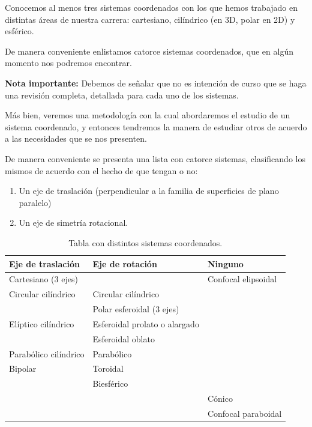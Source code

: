 Conocemos al menos tres sistemas coordenados con los que hemos trabajado en distintas áreas de nuestra carrera: cartesiano, cilíndrico (en 3D, polar en 2D) y esférico.
\par
De manera conveniente enlistamos catorce sistemas coordenados, que en algún momento nos podremos encontrar.
\par
\textbf{Nota importante: } Debemos de señalar que no es intención de curso que se haga una revisión completa, detallada para cada uno de los sistemas.
\par
Más bien, veremos una metodología con la cual abordaremos el estudio de un sistema coordenado, y entonces tendremos la manera de estudiar otros de acuerdo a las necesidades que se nos presenten.
\par
De manera conveniente se presenta una lista con catorce sistemas, clasificando los mismos de acuerdo con el hecho de que tengan o no:
\begin{enumerate}
\item Un eje de traslación (perpendicular a la familia de superficies de plano paralelo)
\item Un eje de simetría rotacional.
\end{enumerate}

\renewcommand{\arraystretch}{1.2}
\begin{table}[H]
\centering
\begin{tabular}{p{4cm} p{6cm} p{4cm}}
Eje de traslación & Eje de rotación & Ninguno \\ \hline
Cartesiano ($3$ ejes) & & Confocal elipsoidal \\
Circular cilíndrico & Circular cilíndrico & \\
& Polar esferoidal ($3$ ejes) & \\
Elíptico cilíndrico & Esferoidal prolato o alargado & \\
& Esferoidal oblato & \\
Parabólico cilíndrico & Parabólico & \\
Bipolar & Toroidal & \\
& Biesférico & \\[0.5em]
& & Cónico \\
& & Confocal paraboidal \\
\end{tabular}
\caption{Tabla con distintos sistemas coordenados.}
\label{table:tabla_01}
\end{table}

